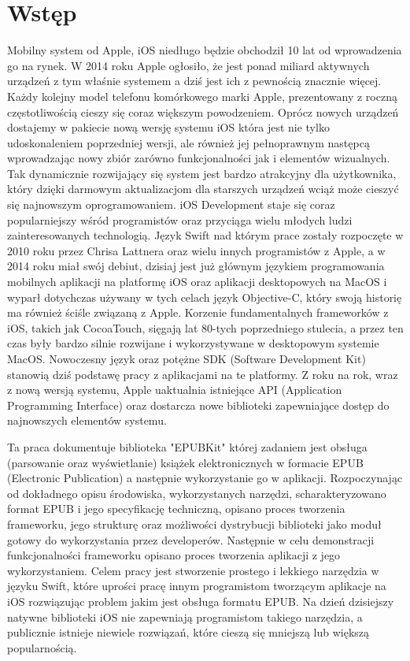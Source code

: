 \chapter{Wstęp}

Mobilny system od Apple, iOS niedługo będzie obchodził 10 lat od wprowadzenia go na rynek. W 2014 roku Apple ogłosiło, że jest ponad miliard aktywnych urządzeń z tym właśnie systemem a dziś jest ich z pewnością znacznie więcej. Każdy kolejny model telefonu komórkowego marki Apple, prezentowany z roczną częstotliwością cieszy się coraz większym powodzeniem. Oprócz nowych urządzeń dostajemy w pakiecie nową wersję systemu iOS która jest nie tylko udoskonaleniem poprzedniej wersji, ale również jej pełnoprawnym następcą wprowadzając nowy zbiór zarówno funkcjonalności jak i elementów wizualnych. Tak dynamicznie rozwijający się system jest bardzo atrakcyjny dla użytkownika, który dzięki darmowym aktualizacjom dla starszych urządzeń wciąż może cieszyć się najnowszym oprogramowaniem. iOS Development staje się coraz popularniejszy wśród programistów oraz przyciąga wielu młodych ludzi zainteresowanych technologią. Język Swift nad którym prace zostały rozpoczęte w 2010 roku przez Chrisa Lattnera oraz wielu innych programistów z Apple, a w 2014 roku miał swój debiut, dzisiaj jest już głównym językiem programowania mobilnych aplikacji na platformę iOS oraz aplikacji desktopowych na MacOS i wyparł dotychczas używany w tych celach język Objective-C, który swoją historię ma również ściśle związaną z Apple. Korzenie fundamentalnych frameworków z iOS, takich jak CocoaTouch, sięgają lat 80-tych poprzedniego stulecia, a przez ten czas były bardzo silnie rozwijane i wykorzystywane w desktopowym systemie MacOS. Nowoczesny język oraz potężne SDK (Software Development Kit) stanowią dziś podstawę pracy z aplikacjami na te platformy. Z roku na rok, wraz z nową wersją systemu, Apple uaktualnia istniejące API (Application Programming Interface) oraz dostarcza nowe biblioteki zapewniające dostęp do najnowszych elementów systemu.


Ta praca dokumentuje biblioteka "EPUBKit" której zadaniem jest obsługa (parsowanie oraz wyświetlanie) książek elektronicznych w formacie EPUB (Electronic Publication) a następnie wykorzystanie go w aplikacji. Rozpoczynając od dokładnego opisu środowiska, wykorzystanych narzędzi, scharakteryzowano format EPUB i jego specyfikację techniczną, opisano proces tworzenia frameworku, jego strukturę oraz możliwości dystrybucji biblioteki jako moduł gotowy do wykorzystania przez developerów. Następnie w celu demonstracji funkcjonalności frameworku opisano proces tworzenia aplikacji z jego wykorzystaniem. Celem pracy jest stworzenie prostego i lekkiego narzędzia w języku Swift, które uprości pracę innym programistom tworzącym aplikacje na iOS rozwiązując problem jakim jest obsługa formatu EPUB. Na dzień dzisiejszy natywne biblioteki iOS nie zapewniają programistom takiego narzędzia, a publicznie istnieje niewiele rozwiązań, które cieszą się mniejszą lub większą popularnością.
